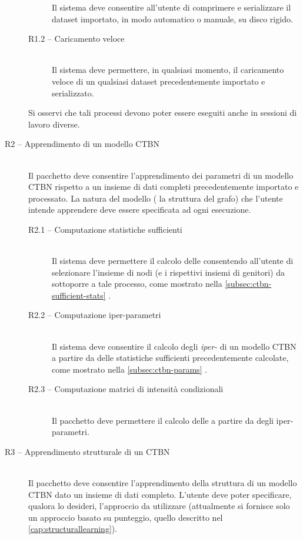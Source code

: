 \begin{description}
\begin{description}
		Il sistema deve consentire all'utente di comprimere e serializzare il dataset importato, in modo automatico o manuale, su disco rigido.
		\item[R1.2 -- Caricamento veloce] \hfill \\
		Il sistema deve permettere, in qualsiasi momento, il caricamento veloce di un qualsiasi dataset precedentemente importato e serializzato.
		\end{description}
		Si osservi che tali processi devono poter essere eseguiti anche in sessioni di lavoro diverse.
	\item[R2 -- Apprendimento di un modello CTBN] \hfill \\
	Il pacchetto deve consentire l'apprendimento dei parametri di un modello \acs{CTBN} rispetto a un insieme di dati completi precedentemente importato e processato. La natura del modello (\ie{} la struttura del grafo) che l'utente intende apprendere deve essere specificata ad ogni esecuzione.
		\begin{description}
		\item[R2.1 -- Computazione statistiche sufficienti] \hfill \\
		Il sistema deve permettere il calcolo delle \emph{} consentendo all'utente di selezionare l'insieme di nodi (e i rispettivi insiemi di genitori) da sottoporre a tale processo, come mostrato nella \autoref{subsec:ctbn-sufficient-stats} .
		\item[R2.2 -- Computazione iper-parametri] \hfill \\
		Il sistema deve consentire il calcolo degli \emph{iper-} di un modello \acs{CTBN} a partire da delle statistiche sufficienti precedentemente calcolate, come mostrato nella \autoref{subsec:ctbn-params} .
		\item[R2.3 -- Computazione matrici di intensità condizionali] \hfill \\
		Il pacchetto deve permettere il calcolo delle \emph{\im{}} a partire da degli iper-parametri.
		\end{description}
	\item[R3 -- Apprendimento strutturale di un CTBN] \hfill \\
	Il pacchetto deve consentire l'apprendimento della struttura di un modello \acs{CTBN} dato un insieme di dati completo. L'utente deve poter specificare, qualora lo desideri, l'approccio da utilizzare (attualmente si fornisce solo un approccio basato su punteggio, quello descritto nel \vref{cap:structurallearning}).

\end{description}
